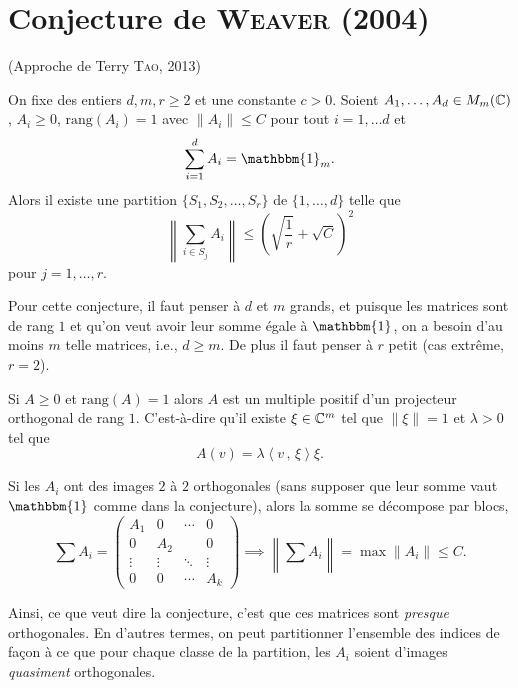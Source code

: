 \section{Conjecture de \textsc{Weaver} (2004)}
\label{sec:conj-de-weaver}
(Approche de Terry \textsc{Tao}, 2013)

\begin{conj}
  \label{conj:conjecture-weaver}
  On fixe des entiers $d, m, r \geq 2$ et une constante $c > 0$. Soient $A_1, \ldots, A_d \in M_m(\mathbb{C})$, $A_i
  \geq 0$, $\mathrm{rang}(A_i) = 1$ avec $\|A_i\| \leq C$ pour tout $i = 1, \ldots d$ et 
  \[ \sum_{i = 1}^{d}A_i = \mathbbm{1}_m. \]
  Alors il existe une partition $\{S_1, S_2, \ldots, S_r\}$ de $\{1, \ldots, d\}$ telle que 
  \[ \left\| \sum_{i \in S_j}^{} A_i \right\| \leq \left(\sqrt{\frac{1}{r}} + \sqrt{C}\right)^2 \]
  pour $j = 1, \ldots, r$.
\end{conj}

Pour cette conjecture, il faut penser à $d$ et $m$ grands, et puisque les matrices sont de rang $1$ et qu'on
veut avoir leur somme égale à $\mathbbm{1}$, on a besoin d'au moins $m$ telle matrices, i.e., $d \geq m$. De
plus il faut penser à $r$ petit (cas extrême, $r = 2$).

Si $A \geq 0$ et $\mathrm{rang}(A) = 1$ alors $A$ est un multiple positif d'un projecteur orthogonal de rang
$1$. C'est-à-dire qu'il existe $\xi \in \mathbb{C}^m$ tel que $\|\xi\| = 1$ et $\lambda > 0$ tel que 
\[ A(v) = \lambda \left \langle v\, ,\, \xi \right \rangle \xi. \]

Si les $A_i$ ont des images $2$ à $2$ orthogonales (sans supposer que leur somme vaut $\mathbbm{1}$ comme dans
la conjecture), alors la somme se décompose par blocs, 
\[ \sum_{}^{} A_i =
  \begin{pmatrix}
    A_1 & 0 & \cdots & 0\\ 0 & A_2 &  & 0\\ \vdots & \vdots & \ddots & \vdots \\ 0 & 0 & \cdots & A_k
  \end{pmatrix} \implies \left \| \sum_{}^{} A_i \right \| = \max \|A_i\| \leq C.
  \]

Ainsi, ce que veut dire la conjecture, c'est que ces matrices sont \textit{presque} orthogonales. En d'autres
termes, on peut partitionner l'ensemble des indices de façon à ce que pour chaque classe de la partition, les
$A_i$ soient d'images \textit{quasiment} orthogonales.

